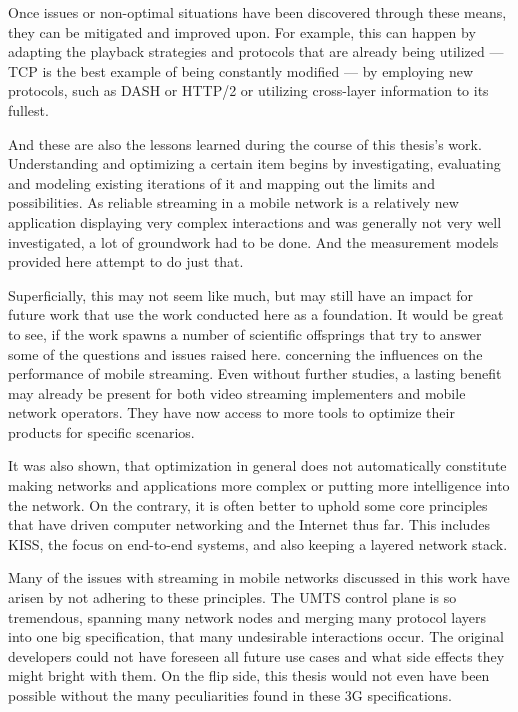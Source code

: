 Once issues or non-optimal situations have been discovered through these means, they can be mitigated and improved upon. For example, this can happen by adapting the playback strategies and protocols that are already being utilized --- \gls{TCP} is the best example of being constantly modified --- by employing new protocols, such as \gls{DASH} or \gls{HTTP}/2 or utilizing cross-layer information to its fullest.

And these are also the lessons learned during the course of this thesis's work. Understanding and optimizing a certain item begins by investigating, evaluating and modeling existing iterations of it and mapping out the limits and possibilities. As reliable streaming in a mobile network is a relatively new application displaying very complex interactions and was generally not very well investigated, a lot of groundwork had to be done. And the measurement models provided here attempt to do just that.

Superficially, this may not seem like much, but may still have an impact for future work that use the work conducted here as a foundation. It would be great to see, if the work spawns a number of scientific offsprings that try to answer some of the questions and issues raised here. concerning the influences on the performance of mobile streaming. Even without further studies, a lasting benefit may already be present for both video streaming implementers and mobile network operators. They have now access to more tools to optimize their products for specific scenarios.

It was also shown, that optimization in general does not automatically constitute making networks and applications more complex or putting more intelligence into the network. On the contrary, it is often better to uphold some core principles that have driven computer networking and the Internet thus far. This includes \gls{KISS}, the focus on end-to-end systems, and also keeping a layered network stack. 

Many of the issues with streaming in mobile networks discussed in this work have arisen by not adhering to these principles. The \gls{UMTS} control plane is so tremendous, spanning many network nodes and merging many protocol layers into one big specification, that many undesirable interactions occur. The original developers could not have foreseen all future use cases and what side effects they might bright with them. On the flip side, this thesis would not even have been possible without the many peculiarities found in these \gls{3G} specifications.



